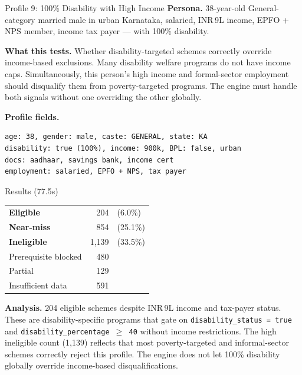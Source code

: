 \documentclass[11pt,a4paper]{article}
\newcommand{\rupee}{INR\,}
\newcommand{\ic}[1]{\texttt{\color{accent}#1}}
\begin{document}
\begin{profilebox}{Profile 9: 100\% Disability with High Income}
\textbf{Persona.} 38-year-old General-category married male in urban Karnataka, salaried, \rupee 9L income, EPFO + NPS member, income tax payer --- with 100\% disability.

\textbf{What this tests.} Whether disability-targeted schemes correctly override income-based exclusions. Many disability welfare programs do not have income caps. Simultaneously, this person's high income and formal-sector employment should disqualify them from poverty-targeted programs. The engine must handle both signals without one overriding the other globally.

\textbf{Profile fields.}
\begin{lstlisting}
age: 38, gender: male, caste: GENERAL, state: KA
disability: true (100%), income: 900k, BPL: false, urban
docs: aadhaar, savings bank, income cert
employment: salaried, EPFO + NPS, tax payer
\end{lstlisting}

\begin{resultbox}{Results (77.5s)}
\begin{tabular}{@{}lrl@{}}
  \textcolor{eligible}{\textbf{Eligible}} & 204 & (6.0\%) \\
  \textcolor{nearmiss}{\textbf{Near-miss}} & 854 & (25.1\%) \\
  \textcolor{inelig}{\textbf{Ineligible}} & 1{,}139 & (33.5\%) \\
  Prerequisite blocked & 480 & \\
  Partial & 129 & \\
  Insufficient data & 591 & \\
\end{tabular}
\end{resultbox}

\textbf{Analysis.} 204 eligible schemes despite \rupee 9L income and tax-payer status. These are disability-specific programs that gate on \ic{disability\_status = true} and \ic{disability\_percentage $\geq$ 40} without income restrictions. The high ineligible count (1{,}139) reflects that most poverty-targeted and informal-sector schemes correctly reject this profile. The engine does not let 100\% disability globally override income-based disqualifications.
\end{profilebox}
\end{document}
